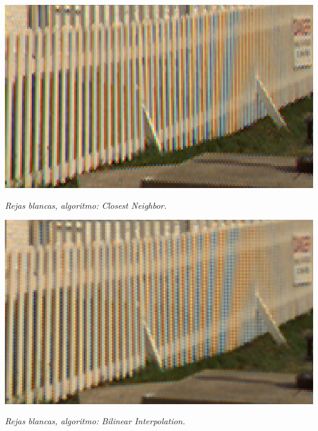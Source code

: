 	\begin{center}
		\includegraphics[scale=.5]{../enunciado/images_files/cualitativo/pharo_rails_closest.png}
		\vspace{2pt}
		\par
		\footnotesize\textit{Rejas blancas, algoritmo: Closest Neighbor.}
	\end{center}


	\begin{center}
		\includegraphics[scale=.5]{../enunciado/images_files/cualitativo/pharo_rails_bilinear.png}
		\vspace{2pt}
		\par
		\footnotesize\textit{Rejas blancas, algoritmo: Bilinear Interpolation.}
	\end{center}


